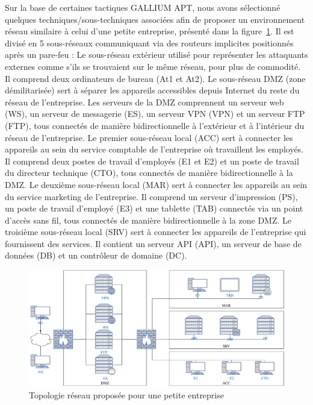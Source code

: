 \noindent
Sur la base de certaines tactiques GALLIUM APT, nous avons sélectionné quelques techniques/sous-techniques associées afin de proposer un environnement réseau similaire à celui d'une petite entreprise, présenté dans la figure~\ref{fig:scenario_network_topology}. Il est divisé en 5 sous-réseaux communiquant via des routeurs implicites positionnés après un pare-feu :
Le sous-réseau extérieur utilisé pour représenter les attaquants externes comme s'ils se trouvaient sur le même réseau, pour plus de commodité. Il comprend deux ordinateurs de bureau (At1 et At2).
Le sous-réseau DMZ (zone démilitarisée) sert à séparer les appareils accessibles depuis Internet du reste du réseau de l'entreprise. Les serveurs de la DMZ comprennent un serveur web (WS), un serveur de messagerie (ES), un serveur VPN (VPN) et un serveur FTP (FTP), tous connectés de manière bidirectionnelle à l'extérieur et à l'intérieur du réseau de l'entreprise.
Le premier sous-réseau local (ACC) sert à connecter les appareils au sein du service comptable de l'entreprise où travaillent les employés. Il comprend deux postes de travail d'employés (E1 et E2) et un poste de travail du directeur technique (CTO), tous connectés de manière bidirectionnelle à la DMZ. %
Le deuxième sous-réseau local (MAR) sert à connecter les appareils au sein du service marketing de l'entreprise. Il comprend un serveur d'impression (PS), un poste de travail d'employé (E3) et une tablette (TAB) connectés via un point d'accès sans fil, tous connectés de manière bidirectionnelle à la zone DMZ. %
Le troisième sous-réseau local (SRV) sert à connecter les appareils de l'entreprise qui fournissent des services. Il contient un serveur API (API), un serveur de base de données (DB) et un contrôleur de domaine (DC).

\begin{figure}
    \centering
    \includegraphics[width=\linewidth]{figures/topology.pdf}
    \caption{Topologie réseau proposée pour une petite entreprise}
    \label{fig:scenario_network_topology}
\end{figure}


